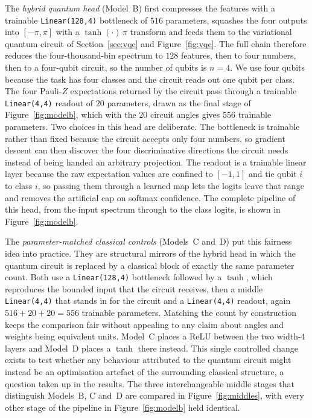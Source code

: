 The \emph{hybrid quantum head} (Model~B) first compresses the features with a
trainable \texttt{Linear(128,4)} bottleneck of $516$ parameters, squashes the four
outputs into $[-\pi,\pi]$ with a $\tanh(\cdot)\,\pi$ transform and feeds them to the
variational quantum circuit of Section~\ref{sec:vqc} and Figure~\ref{fig:vqc}. The full
chain therefore reduces the four-thousand-bin spectrum to $128$ features, then to four
numbers, then to a four-qubit circuit, so the number of qubits is $n=4$. We use four
qubits because the task has four classes and the circuit reads out one qubit per class.
The four Pauli-$Z$ expectations returned by the circuit pass through a trainable
\texttt{Linear(4,4)} readout of $20$ parameters, drawn as the final stage of
Figure~\ref{fig:modelb}, which with the $20$ circuit angles
gives $556$ trainable parameters. Two choices in this head are deliberate. The
bottleneck is trainable rather than fixed because the circuit accepts only four
numbers, so gradient descent can then discover the four discriminative directions
the circuit needs instead of being handed an arbitrary projection. The readout is a
trainable linear layer because the raw expectation values are confined to $[-1,1]$
and tie qubit $i$ to class $i$, so passing them through a learned map lets the logits
leave that range and removes the artificial cap on softmax confidence. The complete
pipeline of this head, from the input spectrum through to the class logits, is shown
in Figure~\ref{fig:modelb}.

The \emph{parameter-matched classical controls} (Models~C and~D) put this fairness
idea into practice. They are structural mirrors of the hybrid head in which the quantum
circuit is replaced by a classical block of exactly the same parameter count. Both use a \texttt{Linear(128,4)} bottleneck followed by a $\tanh$, which
reproduces the bounded input that the circuit receives, then a middle
\texttt{Linear(4,4)} that stands in for the circuit and a \texttt{Linear(4,4)}
readout, again $516 + 20 + 20 = 556$ trainable parameters. Matching the count by
construction keeps the comparison fair without appealing to any claim about angles and
weights being equivalent units. Model~C places a ReLU between the two width-4 layers and
Model~D places a
$\tanh$ there instead. This single controlled change exists to test whether any
behaviour attributed to the quantum circuit might instead be an optimisation artefact
of the surrounding classical structure, a question taken up in the results. The three
interchangeable middle stages that distinguish Models~B, C and~D are compared in
Figure~\ref{fig:middles}, with every other stage of the pipeline in
Figure~\ref{fig:modelb} held identical.

